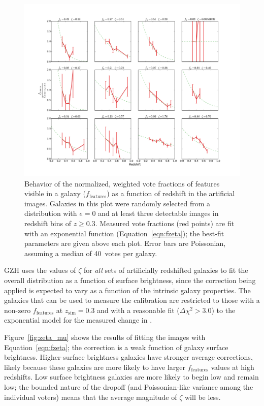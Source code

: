 \documentclass[twocolumn]{aastex6}
\begin{document}
\begin{figure}
\center
\includegraphics[width=\textwidth]{figures/zeta_examples.pdf}
\caption{Behavior of the normalized, weighted vote fractions of features visible in a galaxy ($f_\textrm{features}$) as a function of redshift in the artificial \ferengi{} images. Galaxies in this plot were randomly selected from a distribution with $e=0$ and at least three detectable images in redshift bins of $z\ge0.3$. Measured vote fractions (red points) are fit with an exponential function (Equation~\ref{eqn:fzeta}); the best-fit parameters are given above each plot. Error bars are Poissonian, assuming a median of 40~votes per galaxy.}
\label{fig:zeta_examples}
\end{figure}

GZH uses the values of $\zeta$ for \emph{all} sets of artificially redshifted galaxies to fit the overall distribution as a function of surface brightness, since the correction being applied is expected to vary as a function of the intrinsic galaxy properties. The galaxies that can be used to measure the calibration are restricted to those with a non-zero $f_\textrm{features}$ at $z_\mathrm{sim}=0.3$ and with a reasonable fit ($\Delta \chi^2 > 3.0$) to the exponential model for the measured change in \ffeatures. 

Figure~\ref{fig:zeta_mu} shows the results of fitting the \ferengi{} images with Equation~\ref{eqn:fzeta}; the correction is a weak function of galaxy surface brightness. Higher-surface brightness galaxies have stronger average corrections, likely because these galaxies are more likely to have larger $f_\textrm{features}$ values at high redshifts. Low surface brightness galaxies are more likely to begin low and remain low; the bounded nature of the dropoff (and Poissonian-like variance among the individual voters) means that the average magnitude of $\zeta$ will be less. 
\end{document}
